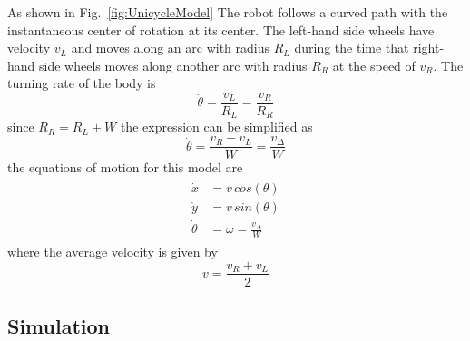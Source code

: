 As shown in Fig.~\ref{fig:UnicycleModel} The robot follows a curved path with the instantaneous center of rotation at its center. 
The left-hand side wheels have velocity $v_L$ and moves along an arc with radius $R_L$ during the time that right-hand side wheels moves along another arc with radius $R_R$ at the speed of $v_R$. 
The turning rate of the body is
\begin{equation*}
\dot{\theta}= \frac{v_L}{R_L} = \frac{v_R}{R_R}
\end{equation*}
since $R_R = R_L + W$ the expression can be simplified as
\begin{equation}
\dot{\theta}= \frac{v_R - v_L}{W} = \frac{v_\Delta}{W}\label{eq:ThetaDot}
\end{equation}
the equations of motion for this model are
\begin{eqnarray}
\begin{aligned}
\dot{x} &= v\,cos(\theta)\\
\dot{y} &= v\,sin(\theta)\\
\dot{\theta} &= \omega = \frac{v_\Delta}{W}
\end{aligned}
\label{eq:MotionEq}
\end{eqnarray}
where the average velocity\parencite{Corke2011} is given by        
\begin{equation}
v = \frac{v_R + v_L}{2} 
\label{eq:av_velocity}
\end{equation}

\subsection{Simulation}
